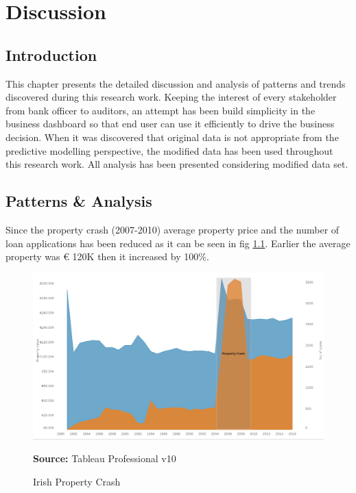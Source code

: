 %
%
%
%

\chapter{Discussion}\label{C.Discussion}

\section{Introduction}\label{S.Discussion.intro}

This chapter presents the detailed discussion and analysis of patterns and trends discovered during this research work. Keeping the interest of every stakeholder from bank officer to auditors, an attempt has been build simplicity in the business dashboard so that end user can use it efficiently to drive the business decision. When it was discovered that original data is not appropriate from the predictive modelling perspective, the modified data has been used throughout this research work. All analysis has been presented considering modified data set.

\section{Patterns \&  Analysis}

Since the property crash (2007-2010) average property price and the number of loan applications has been reduced as it can be seen in fig \ref{fig:crash1}. Earlier the average property was € 120K then it increased by 100\%.

\begin{center}
\begin{figure}[!htb]
\includegraphics[scale=0.5]{crash1.png}
\centering
\caption{Irish Property Crash}{\textbf{Source:} Tableau Professional v10}
\label{fig:crash1}
\end{figure}
\end{center}

